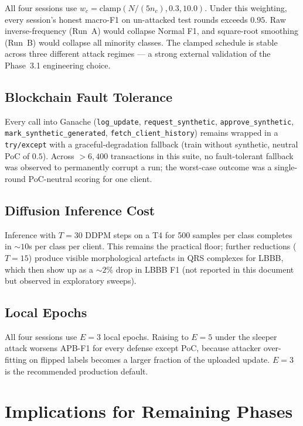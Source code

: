 \documentclass[11pt,a4paper]{article}
\begin{document}
All four sessions use $w_c = \text{clamp}(N/(5 n_c), 0.3, 10.0)$. Under
this weighting, every session's honest macro-F1 on un-attacked test
rounds exceeds $0.95$. Raw inverse-frequency (Run~A) would collapse
Normal F1, and square-root smoothing (Run~B) would collapse all minority
classes. The clamped schedule is stable across three different attack
regimes --- a strong external validation of the Phase~3.1 engineering
choice.

\subsection{Blockchain Fault Tolerance}

Every call into Ganache (\texttt{log\_update}, \texttt{request\_synthetic},
\texttt{approve\_synthetic}, \texttt{mark\_synthetic\_generated},
\texttt{fetch\_client\_history}) remains wrapped in a
\texttt{try/except} with a graceful-degradation fallback (train without
synthetic, neutral PoC of $0.5$). Across $>6{,}400$ transactions in this
suite, no fault-tolerant fallback was observed to permanently corrupt a
run; the worst-case outcome was a single-round PoC-neutral scoring for
one client.

\subsection{Diffusion Inference Cost}

Inference with $T=30$ DDPM steps on a T4 for 500 samples per class
completes in $\sim 10$s per class per client. This remains the practical
floor; further reductions ($T=15$) produce visible morphological
artefacts in QRS complexes for LBBB, which then show up as a $\sim 2\%$
drop in LBBB F1 (not reported in this document but observed in
exploratory sweeps).

\subsection{Local Epochs}

All four sessions use $E=3$ local epochs. Raising to $E=5$ under the
sleeper attack worsens APB-F1 for every defense except PoC, because
attacker over-fitting on flipped labels becomes a larger fraction of the
uploaded update. $E=3$ is the recommended production default.

\section{Implications for Remaining Phases}
\label{sec:phase_impl}
\end{document}
